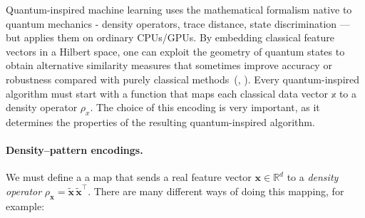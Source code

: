 \documentclass[twocolumn]{article} %
\begin{document}
Quantum-inspired machine learning uses the mathematical formalism native to
quantum mechanics - density operators, trace distance, state discrimination — but applies them on ordinary CPUs/GPUs.  By
embedding classical feature vectors in a Hilbert space, one can exploit
the geometry of quantum states to obtain alternative similarity
measures that sometimes improve accuracy or robustness compared with
purely classical methods~(\cite{Cruzeiro2024}, \cite{Sergioli2025}). 
Every quantum-inspired algorithm must start with a function that maps each classical data vector $\mathbb{x}$ to a density operator $\rho_x$.  
The choice of this encoding is very important, as it determines the properties of the resulting quantum-inspired algorithm.  

\paragraph{Density--pattern encodings.}\label{par:encodings}
We must define a a map that sends a real feature vector \(\mathbf x\in\mathbb R^{d}\) to a
\emph{density operator}
\(\rho_{\mathbf x}= \tilde{\mathbf x}\,
                    \tilde{\mathbf x}^{\!\top}\). There are many different ways of doing this mapping, for example:
\end{document}
